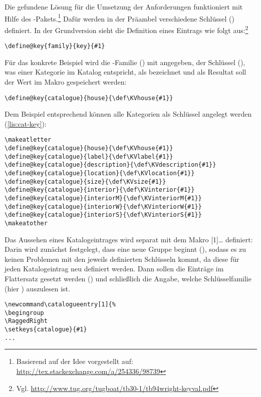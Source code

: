 \documentclass[ngerman]{dtk}
\makeatletter
\newcommand\catalogueentry[1]{%
\RaggedRight\begingroup
\setkeys{catalogue}{#1}%
\ifdef{\KVhouse}{\section{\KVhouse
			\ifdef{\KVlabel}{\label{\KVlabel}}{}}
			}{}%
\begin{labeling}{Beschreibung}
\ifdef{\KVdescription}{\item[Beschreibung] \KVdescription}{}%
\ifdef{\KVlocation}{\item[Verortung] \KVlocation}{}%
\ifdef{\KVinterior}{%
	\item[Ausstattung] \KVinterior %
	\ifboolexpr{bool{@KVinteriorM} or bool {@KVinteriorW} or bool {@KVinteriorS}}{%
	\begin{labeling}{Wandgemälde}
			\ifdef{\KVinteriorM}{\item[Mosaike:] \KVinteriorM}{}
			\ifdef{\KVinteriorW}{\item[Wandgemälde:] \KVinteriorW}{}
			\ifdef{\KVinteriorS}{\item[Statuen:] \KVinteriorS}{}
			\end{labeling}
		}{}}%
	{%
	\ifboolexpr{bool{@KVinteriorM} or bool {@KVinteriorW} or bool {@KVinteriorS}}{%
		\item[Ausstattung]%
	\begin{labeling}{Wandgemälde}	
				\ifdef{\KVinteriorM}{\item[Mosaike:] \KVinteriorM}{}
				\ifdef{\KVinteriorW}{\item[Wandgemälde:] \KVinteriorW}{}
				\ifdef{\KVinteriorS}{\item[Statuen:] \KVinteriorS}{}
			\end{labeling}
	}{}}%
\ifdef{\KVsize}{	\item[Größe] \SI{\KVsize}{\meter\squared}}{}%
\ifdef{\KVbackref}{\item[Erwähnungen]S.\ \KVbackref}{}%
\end{labeling}
\endgroup
}
\makeatother
\begin{document}
Die gefundene Lösung für die Umsetzung der Anforderungen funktioniert mit Hilfe des   -Pakets.\footnote{Basierend auf der Idee vorgestellt auf: \url{http://tex.stackexchange.com/a/254336/98739}}
Dafür werden in der Präambel verschiedene Schlüssel () definiert.
In der Grundversion sieht die Definition eines Eintrags wie folgt aus:\footnote{Vgl. \url{http://www.tug.org/tugboat/tb30-1/tb94wright-keyval.pdf}}
\begin{lstlisting}[style=noNumber]
\define@key{family}{key}{#1}
\end{lstlisting}
Für das konkrete Beispiel wird die -Familie () mit  angegeben,
der Schlüssel (), was einer Kategorie im Katalog entspricht, 
als  bezeichnet und als Resultat soll der Wert im Makro  gespeichert werden:
\begin{lstlisting}[style=noNumber]
\define@key{catalogue}{house}{\def\KVhouse{#1}}
\end{lstlisting}
Dem Beispiel entsprechend können alle Kategorien als Schlüssel angelegt werden (\cref{lis:cat-key}):
\begin{lstlisting}[style=number,caption={Definition der Schlüssel},label={lis:cat-key}]
\makeatletter
\define@key{catalogue}{house}{\def\KVhouse{#1}}
\define@key{catalogue}{label}{\def\KVlabel{#1}}
\define@key{catalogue}{description}{\def\KVdescription{#1}}
\define@key{catalogue}{location}{\def\KVlocation{#1}}
\define@key{catalogue}{size}{\def\KVsize{#1}}
\define@key{catalogue}{interior}{\def\KVinterior{#1}}
\define@key{catalogue}{interiorM}{\def\KVinteriorM{#1}}
\define@key{catalogue}{interiorW}{\def\KVinteriorW{#1}}
\define@key{catalogue}{interiorS}{\def\KVinteriorS{#1}}
\makeatother
\end{lstlisting}
Das Aussehen eines Katalogeintrages wird separat mit dem Makro
 [1]{\ldots} 
definiert:
Darin wird zunächst festgelegt,
dass eine neue Gruppe beginnt (), sodass
es zu keinen Problemen mit den jeweils definierten Schlüsseln kommt, 
da diese für jeden Katalogeintrag neu definiert werden.
Dann sollen die  Einträge im Flattersatz gesetzt werden () und schließlich die Angabe,
 welche Schlüsselfamilie (hier ) auszulesen ist.
\begin{lstlisting}[style=number,caption={Definition der Katalogeinträge, Anfang},label={lis:cat-1}]
\newcommand\catalogueentry[1]{%
\begingroup
\RaggedRight
\setkeys{catalogue}{#1}
...
\end{lstlisting}
\end{document}

